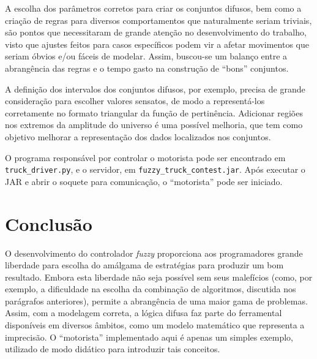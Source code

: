 \documentclass{../../sftex/sftex}
\begin{document}
A escolha dos parâmetros corretos para criar os conjuntos difusos, bem como
a criação de regras para diversos comportamentos que naturalmente seriam
triviais, são pontos que necessitaram de grande atenção no desenvolvimento do
trabalho, visto que ajustes feitos para casos específicos podem vir a afetar
movimentos que seriam óbvios e/ou fáceis de modelar. Assim, buscou-se um
balanço entre a abrangência das regras e o tempo gasto na construção de
``bons'' conjuntos. \medskip

A definição dos intervalos dos conjuntos difusos, por exemplo, precisa de
grande consideração para escolher valores sensatos, de modo a representá-los
corretamente no formato triangular da função de pertinência. Adicionar regiões
nos extremos da amplitude do universo é uma  possível melhoria, que tem como
objetivo melhorar a representação dos dados localizados nos conjuntos. \medskip

O programa responsável por controlar o motorista pode ser encontrado em
\texttt{truck\_driver.py}, e o servidor, em \texttt{fuzzy\_truck\_contest.jar}.
Após executar o JAR e abrir o soquete para comunicação, o ``motorista'' pode
ser iniciado.

\section{Conclusão}

O desenvolvimento do controlador \emph{fuzzy} proporciona aos programadores
grande liberdade para escolha do amálgama de estratégias para produzir um bom
resultado. Embora esta liberdade não seja possível sem seus malefícios (como,
por exemplo, a dificuldade na escolha da combinação de algoritmos, discutida
nos parágrafos anteriores), permite a abrangência de uma maior gama de
problemas. Assim, com a modelagem correta, a lógica difusa faz parte do
ferramental disponíveis em diversos âmbitos, como um modelo matemático que
representa a imprecisão. O ``motorista'' implementado aqui é apenas um simples
exemplo, utilizado de modo didático para introduzir tais conceitos.
\end{document}
